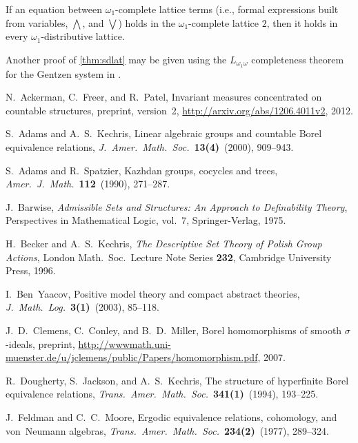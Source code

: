 \documentclass[11pt]{article}
\begin{document}
\begin{corollary}
\label{thm:sdlat-thy}
If an equation between $\omega_1$-complete lattice terms (i.e., formal expressions built from variables, $\bigwedge$, and $\bigvee$) holds in the $\omega_1$-complete lattice $2$, then it holds in every $\omega_1$-distributive lattice.
\end{corollary}

\begin{remark}
Another proof of \cref{thm:sdlat} may be given using the $L_{\omega_1\omega}$ completeness theorem for the Gentzen system in \cite{LE}.
\end{remark}


\begin{thebibliography}{00000}

  N.~Ackerman, C.~Freer, and R.~Patel, Invariant measures concentrated on countable structures, preprint, version~2, \url{http://arxiv.org/abs/1206.4011v2}, 2012.

  S.~Adams and A.~S.~Kechris, Linear algebraic groups and countable Borel equivalence relations, \emph{J.\ Amer.\ Math.\ Soc.}\ \textbf{13(4)}~(2000), 909--943.

  S.~Adams and R.~Spatzier, Kazhdan groups, cocycles and trees, \emph{Amer.\ J.\ Math.}\ \textbf{112}~(1990), 271--287.

  J.~Barwise, \emph{Admissible Sets and Structures: An Approach to Definability Theory}, Perspectives in Mathematical Logic, vol.~7, Springer-Verlag, 1975.

  H.~Becker and A.~S.~Kechris, \emph{The Descriptive Set Theory of Polish Group Actions}, London Math.\ Soc.\ Lecture Note Series \textbf{232}, Cambridge University Press, 1996.

  I.~Ben~Yaacov, Positive model theory and compact abstract theories, \emph{J.\ Math.\ Log.}\ \textbf{3(1)}~(2003), 85--118.

  J.~D.~Clemens, C.~Conley, and B.~D.~Miller, Borel homomorphisms of smooth $\sigma$-ideals, preprint, \url{http://wwwmath.uni-muenster.de/u/jclemens/public/Papers/homomorphism.pdf}, 2007.

  R.~Dougherty, S.~Jackson, and A.~S.~Kechris, The structure of hyperfinite Borel equivalence relations, \emph{Trans.\ Amer.\ Math.\ Soc.}\ \textbf{341(1)}~(1994), 193--225.

  J.~Feldman and C.~C.~Moore, Ergodic equivalence relations, cohomology, and von~Neumann algebras, \emph{Trans.\ Amer.\ Math.\ Soc.}\ \textbf{234(2)}~(1977), 289--324.


\end{thebibliography}
\end{document}
